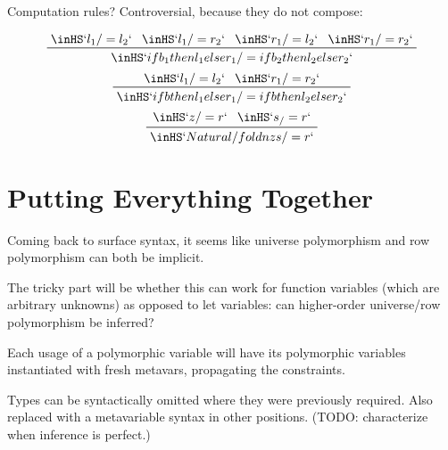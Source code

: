 \documentclass[11pt, twoside, reqno]{book}
\begin{document}
Computation rules?
Controversial, because they do not compose:

\begin{displaymath}
\prftree{\inHS`l_1 /= l_2`}{\inHS`l_1 /= r_2`}{\inHS`r_1 /= l_2`}{\inHS`r_1 /= r_2`}{\inHS`if b_1 then l_1 else r_1 /= if b_2 then l_2 else r_2`}
\end{displaymath}
\begin{displaymath}
\prftree{\inHS`l_1 /= l_2`}{\inHS`r_1 /= r_2`}{\inHS`if b then l_1 else r_1 /= if b then l_2 else r_2`}
\end{displaymath}
\begin{displaymath}
\prftree{\inHS`z /= r`}{\inHS`s _ /= r`}{\inHS`Natural/fold n z s /= r`}
\end{displaymath}





\chapter{Putting Everything Together}
Coming back to surface syntax, it seems like universe polymorphism and row polymorphism can both be implicit.

The tricky part will be whether this can work for function variables (which are arbitrary unknowns) as opposed to let variables: can higher-order universe/row polymorphism be inferred?

Each usage of a polymorphic variable will have its polymorphic variables instantiated with fresh metavars, propagating the constraints.

Types can be syntactically omitted where they were previously required.
Also replaced with a metavariable syntax in other positions.
(TODO: characterize when inference is perfect.)


\iffalse
\begin{appdices}
\end{appdices}


\begin{bibliog}
\end{bibliog}
\fi
\end{document}

